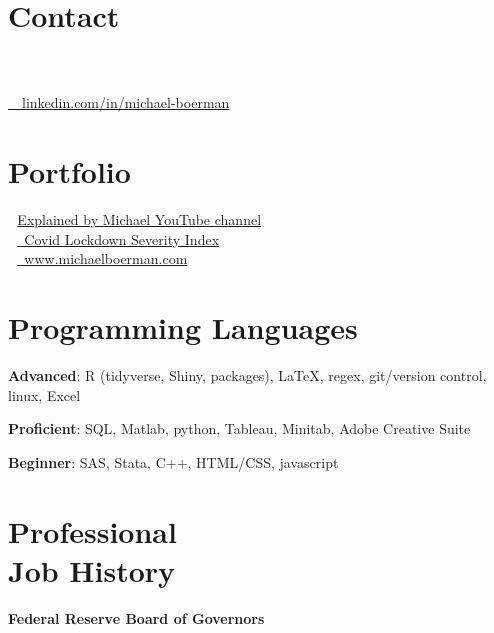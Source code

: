 \documentclass[margin,line]{res}
\begin{document}

\begin{resume}
\section{\sc Contact}

 \\
 \\
\faLinkedinIn  \href{https://www.linkedin.com/in/michael-boerman}{\ttfamily \, \, linkedin.com/in/michael-boerman}\\
\vspace{-.35cm}


\section{\sc Portfolio}
 \,\, \href{https://www.youtube.com/channel/UCxFMrMb6PrS7SOrQi-BfMUw/videos?view=0&sort=p&flow=grid}{ Explained by Michael YouTube channel}\\
\faChartLine \,\, \href{https://github.com/michaelboerman/lockdown_severity_index#readme}{\, Covid Lockdown Severity Index}\\
\faBriefcase \,\, \href{https://www.michaelboerman.com/}{\ttfamily  \, www.michaelboerman.com}\\
\vspace{-.35cm}

\section{\sc Programming Languages} 
{\bf Advanced}:  R (tidyverse, Shiny, packages), \LaTeX, regex, git/version control, linux, Excel
\vspace*{-3mm}

{\bf Proficient}: SQL, Matlab, python, Tableau, Minitab, Adobe Creative Suite
\vspace*{-3mm}

{\bf Beginner}:  SAS, Stata, C++, HTML/CSS, javascript

\section{\sc Professional \\ Job History}
{\bf Federal Reserve Board of Governors}\\


\end{resume}
\end{document}
